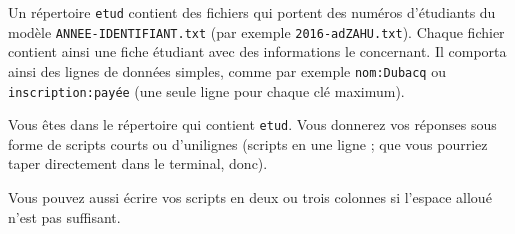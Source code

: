 \documentclass[a4paper]{iutvexam}
\begin{document}
\begin{questions}

  Un répertoire \texttt{etud} contient des fichiers qui portent des
  numéros d'étudiants du modèle \texttt{ANNEE-IDENTIFIANT.txt} (par
  exemple \texttt{2016-adZAHU.txt}). Chaque fichier contient ainsi une
  fiche étudiant avec des informations le concernant. Il comporta ainsi
  des lignes de données simples, comme par exemple \texttt{nom:Dubacq}
  ou \texttt{inscription:payée} (une seule ligne pour chaque clé
  maximum).

  Vous êtes dans le répertoire qui contient \texttt{etud}. Vous donnerez
  vos réponses sous forme de scripts courts ou d'unilignes (scripts en
  une ligne ; que vous pourriez taper directement dans le terminal,
  donc).

  Vous pouvez aussi écrire vos scripts en deux ou trois colonnes si
  l'espace alloué n'est pas suffisant.

\end{questions}
\end{document}
